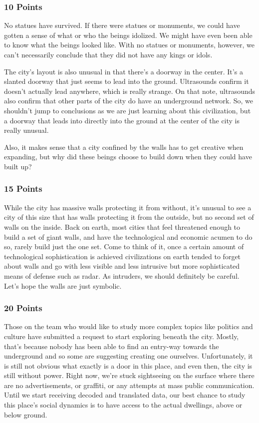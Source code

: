 \documentclass[conference]{IEEEtran}
\begin{document}
\subsubsection*{10 Points}
No statues have survived. If there were statues or monuments, we could have gotten a sense of what or who the beings idolized. We might have even been able to know what the beings looked like. With no statues or monuments, however, we can’t necessarily conclude that they did not have any kings or idols. 

The city’s layout is also unusual in that there’s a doorway in the center. It’s a slanted doorway that just seems to lead into the ground. Ultrasounds confirm it doesn’t actually lead anywhere, which is really strange. On that note, ultrasounds also confirm that other parts of the city do have an underground network. So, we shouldn’t  jump to conclusions as we are just learning about this civilization, but a doorway that leads into directly into the ground at the center of the city is really unusual.

Also, it makes sense that a city confined by the walls has to get creative when expanding, but why did these beings choose to build down when they could have built up?

\subsubsection*{15 Points}
While the city has massive walls protecting it from without, it’s unusual to see a city of this size that has walls protecting it from the outside, but no second set of walls on the inside. Back on earth, most cities that feel threatened enough to build a set of giant walls, and have the technological and economic acumen to do so, rarely build just the one set. Come to think of it, once a certain amount of technological sophistication is achieved civilizations on earth tended to forget about walls and go with less visible and less intrusive but more sophisticated means of defense such as radar. As intruders, we should definitely be careful. Let’s hope the walls are just symbolic.

\subsubsection*{20 Points}
Those on the team who would like to study more complex topics like politics and culture have submitted a request to start exploring beneath the city. Mostly, that’s because nobody has been able to find an entry-way towards the underground and so some are suggesting creating one ourselves. Unfortunately, it is still not obvious what exactly is a door in this place, and even then, the city is still without power. Right now, we’re stuck sightseeing on the surface where there are no advertisements, or graffiti, or any attempts at mass public communication. Until we start receiving decoded and translated data, our best chance to study this place’s social dynamics is to have access to the actual dwellings, above or below ground.
\end{document}
